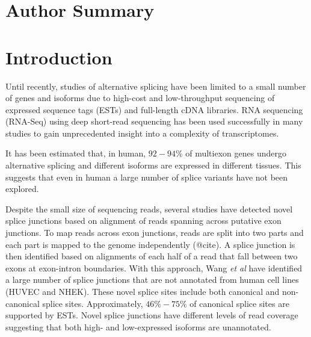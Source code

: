 \documentclass[10pt]{article}
\begin{document}



\section*{Author Summary}

\section*{Introduction}

Until recently, studies of alternative splicing have been limited to a
small number of genes and isoforms due to high-cost and low-throughput
sequencing of expressed sequence tags (ESTs) and full-length cDNA
libraries.  RNA sequencing (RNA-Seq) using deep short-read sequencing
has been used successfully in many studies to gain unprecedented
insight into a complexity of transcriptomes.

It has been estimated that, in human, $92-94$\% of multiexon genes
undergo alternative splicing and different isoforms are expressed in
different tissues\cite{Wang:2008ea}.  This suggests that even in human
a large number of splice variants have not been explored.


Despite the small size of sequencing reads, several studies have
detected novel splice junctions based on alignment of reads spanning
across putative exon junctions.  To map reads across exon junctions,
reads are split into two parts and each part is mapped to the genome
independently (@cite).  A splice junction is then identified based on
alignments of each half of a read that fall between two exons at
exon-intron boundaries.  With this approach, Wang \emph{et al} have
identified a large number of splice junctions that are not annotated
from human cell lines (HUVEC and NHEK)\cite{Wang:2011jq}.  These novel
splice sites include both canonical and non-canonical splice sites.
Approximately, $46\%-75\%$ of canonical splice sites are supported by
ESTs.  Novel splice junctions have different levels of read coverage
suggesting that both high- and low-expressed isoforms are unannotated.
\end{document}
